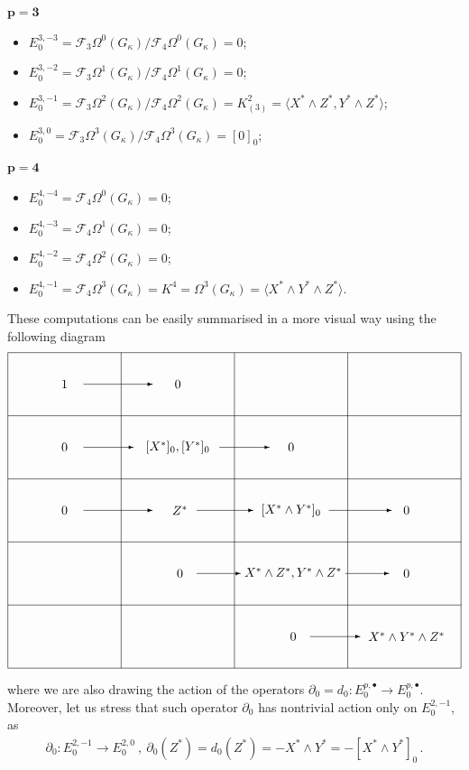 \documentclass[10pt]{amsart}
\theoremstyle{remark}
\numberwithin{equation}{section}
\begin{document}
$\mathbf{p=3}$
\begin{itemize}
    \item $E_0^{3,-3}=\mathcal{F}_3\Omega^0(G_\kappa)/\mathcal{F}_4\Omega^0(G_\kappa)=0$;
    \item $E_0^{3,-2}=\mathcal{F}_3\Omega^1(G_\kappa)/\mathcal{F}_4\Omega^1(G_\kappa)=0$;
    \item $E_0^{3,-1}=\mathcal{F}_3\Omega^2(G_\kappa)/\mathcal{F}_4\Omega^2(G_\kappa)=K^2_{(3)}=\langle X^\ast\wedge Z^\ast, Y^\ast\wedge Z^\ast\rangle$;
    \item $E_0^{3,0}=\mathcal{F}_3\Omega^3(G_\kappa)/\mathcal{F}_4\Omega^3(G_\kappa)=[0]_0$;
\end{itemize}
$\mathbf{p=4}$
\begin{itemize}
    \item $E_0^{4,-4}=\mathcal{F}_{4}\Omega^0(G_\kappa)=0$;
    \item $E_0^{4,-3}=\mathcal{F}_4\Omega^1(G_\kappa)=0$;
    \item $E_0^{4,-2}=\mathcal{F}_4\Omega^2(G_\kappa)=0$;
    \item $E_0^{4,-1}=\mathcal{F}_4\Omega^3(G_\kappa)=K^4=\Omega^3(G_\kappa)=\langle X^\ast\wedge Y^\ast\wedge Z^\ast\rangle$.
\end{itemize}
These computations can be easily summarised in a more visual way using the following diagram
\begin{align*}
    \begin{picture}(360,250)(0,0)
   \put(  0,  0){\line( 1, 0){360}}
   \put(  0,  0){\line( 0, 1){250}}
   \multiput(  0, 50)( 0,50){5}{\line( 1, 0){360}}
   \multiput( 90,  0)(90, 0){4}{\line( 0, 1){250}}
   \put(45,225){\makebox(0,0){$ 1$}}
   \put(45,175){\makebox(0,0){$ 0$}}
   \put(45,125){\makebox(0,0){$0$}}
   \put(135,225){\makebox(0,0){$0$}}
   \put(135,175){\makebox(0,0){$ [X^\ast]_0,[Y^\ast]_0$}}
   \put(135,125){\makebox(0,0){{ $ Z^\ast$}}}
   \put(135,75){\makebox(0,0){{ $ 0$}}}
   \put(225,175){\makebox(0,0){$0$}}
   \put(225,125){\makebox(0,0){$[X^\ast\wedge Y^\ast]_0$}}
   \put(225,75){\makebox(0,0){{ $X^\ast\wedge Z^\ast,Y^\ast\wedge Z^\ast$}}}
   \put(225,25){\makebox(0,0){{ $ 0$}}}
   \put(315,125){\makebox(0,0){{ $0$}}}
   \put(315,75){\makebox(0,0){{ $0$}}}
   \put(315,25){\makebox(0,0){{ $X^\ast\wedge Y^\ast\wedge Z^\ast$}}}
   \put(60,225){\vector(1,0){55}}
   \put(60,175){\vector(1,0){40}}
   \put(60,125){\vector(1,0){55}}
   \put(168,175){\vector(1,0){40}}
   \put(150,125){\vector(1,0){45}}
   \put(150,75){\vector(1,0){35}}
   \put(255,125){\vector(1,0){50}}
   \put(268,75){\vector(1,0){35}}
   \put(240,25){\vector(1,0){40}}
  \end{picture} 
\end{align*}
where we are also drawing the action of the operators $\partial_0=d_0\colon E_0^{p,\bullet}\to E^{p,\bullet}_0$.
Moreover, let us stress that such operator $\partial_0$ has nontrivial action only on $E_0^{2,-1}$, as
\begin{align*}
    \partial_0\colon E^{2,-1}_0\to E^{2,0}_0\ ,\ \partial_0(Z^\ast)=d_0(Z^\ast)=-X^\ast\wedge Y^\ast =-[X^\ast\wedge Y^\ast]_0\,.
\end{align*}
\end{document}
